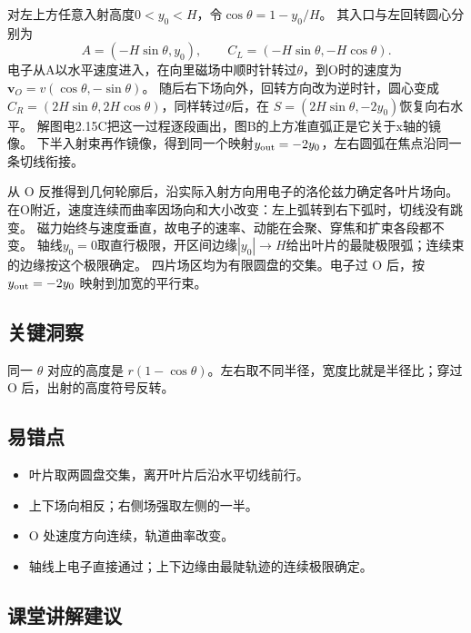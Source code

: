 \documentclass[UTF8,fontset=fandol,a4paper,11pt]{ctexart}
\begin{document}
对左上方任意入射高度$0<y_0<H$，令$\cos\theta=1-y_0/H$。
其入口与左回转圆心分别为
\[
A=(-H\sin\theta,y_0),\qquad C_L=(-H\sin\theta,-H\cos\theta).
\]
电子从A以水平速度进入，在向里磁场中顺时针转过$\theta$，到O时的速度为
$\boldsymbol v_O=v(\cos\theta,-\sin\theta)$。
随后右下场向外，回转方向改为逆时针，圆心变成
$C_R=(2H\sin\theta,2H\cos\theta)$，同样转过$\theta$后，在
$S=(2H\sin\theta,-2y_0)$恢复向右水平。
解图电2.15C把这一过程逐段画出，图B的上方准直弧正是它关于x轴的镜像。
下半入射束再作镜像，得到同一个映射$y_{\rm out}=-2y_0$，左右圆弧在焦点沿同一条切线衔接。

从 O 反推得到几何轮廓后，沿实际入射方向用电子的洛伦兹力确定各叶片场向。
在O附近，速度连续而曲率因场向和大小改变：左上弧转到右下弧时，切线没有跳变。
磁力始终与速度垂直，故电子的速率、动能在会聚、穿焦和扩束各段都不变。
轴线$y_0=0$取直行极限，开区间边缘$|y_0|\to H$给出叶片的最陡极限弧；连续束的边缘按这个极限确定。
四片场区均为有限圆盘的交集。电子过 O 后，按 $y_{\rm out}=-2y_0$ 映射到加宽的平行束。




\subsection*{关键洞察}

同一 $\theta$ 对应的高度是 $r(1-\cos\theta)$。左右取不同半径，宽度比就是半径比；穿过 O 后，出射的高度符号反转。



\subsection*{易错点}

\begin{itemize}
\item 叶片取两圆盘交集，离开叶片后沿水平切线前行。
\item 上下场向相反；右侧场强取左侧的一半。
\item O 处速度方向连续，轨道曲率改变。
\item 轴线上电子直接通过；上下边缘由最陡轨迹的连续极限确定。
\end{itemize}



\subsection*{课堂讲解建议}
\end{document}
